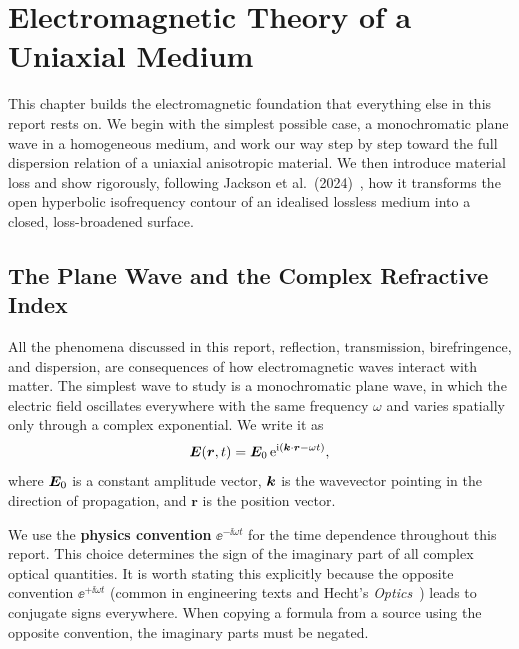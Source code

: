 
\chapter{Electromagnetic Theory of a Uniaxial Medium}
\label{ch:em_theory}

This chapter builds the electromagnetic foundation that everything else in this
report rests on. We begin with the simplest possible case, a monochromatic
plane wave in a homogeneous medium, and work our way step by step toward the
full dispersion relation of a uniaxial anisotropic material. We then introduce
material loss and show rigorously, following Jackson et al.\
(2024)~\cite{jackson2024}, how it transforms the open hyperbolic
isofrequency contour of an idealised lossless medium into a closed,
loss-broadened surface.

\section{The Plane Wave and the Complex Refractive Index}

All the phenomena discussed in this report, reflection, transmission,
birefringence, and dispersion, are consequences of how electromagnetic waves
interact with matter. The simplest wave to study is a monochromatic plane wave,
in which the electric field oscillates everywhere with the same frequency
$\omega$ and varies spatially only through a complex exponential. We write it as
\begin{equation}
  \bm{E}(\bm{r},t) = \bm{E}_0 \, \mathrm{e}^{\mathrm{i}(\bm{k} \cdot \bm{r} - \omega t)},
  \label{eq:ch2_planewave}
\end{equation}
where $\bm{E}_0$ is a constant amplitude vector, $\bm{k}$ is the wavevector
pointing in the direction of propagation, and $\bm{r}$ is the position vector.

We use the \textbf{physics convention} $\ee^{-\ii\omega t}$ for the time
dependence throughout this report. This choice determines the sign of the
imaginary part of all complex optical quantities. It is worth stating this
explicitly because the opposite convention $\ee^{+\ii\omega t}$ (common in
engineering texts and Hecht's \emph{Optics}~\cite{hecht}) leads to conjugate
signs everywhere. When copying a formula from a source using the opposite
convention, the imaginary parts must be negated.

